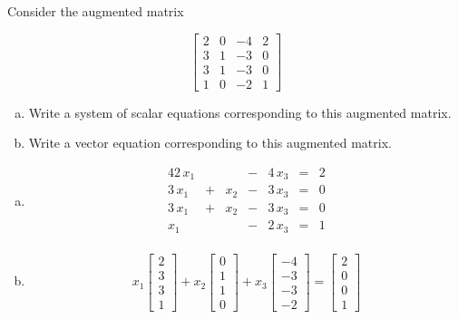 
\begin{exerciseStatement}


 Consider the augmented matrix 

\[ \left[\begin{array}{ccc|c}
2 & 0 & -4 & 2 \\
3 & 1 & -3 & 0 \\
3 & 1 & -3 & 0 \\
1 & 0 & -2 & 1
\end{array}\right] \]
\begin{enumerate}[(a)]
\item  Write a system of scalar equations corresponding to this augmented matrix. 
\item  Write a vector equation corresponding to this augmented matrix. 
\end{enumerate}
    
\end{exerciseStatement}
    
\begin{exerciseAnswer} 

\begin{enumerate}[(a)]
\item 
\begin{alignat*}{4} 2 \, x_{1} & &  &-& 4 \, x_{3} &=& 2 \\3 \, x_{1} &+& x_{2} &-& 3 \, x_{3} &=& 0 \\3 \, x_{1} &+& x_{2} &-& 3 \, x_{3} &=& 0 \\x_{1} & &  &-& 2 \, x_{3} &=& 1 \\ \end{alignat*}
            
\item \[ x_{1} \left[\begin{array}{c}
2 \\
3 \\
3 \\
1
\end{array}\right] + x_{2} \left[\begin{array}{c}
0 \\
1 \\
1 \\
0
\end{array}\right] + x_{3} \left[\begin{array}{c}
-4 \\
-3 \\
-3 \\
-2
\end{array}\right] = \left[\begin{array}{c}
2 \\
0 \\
0 \\
1
\end{array}\right] \]
\end{enumerate}
    
\end{exerciseAnswer}
    
